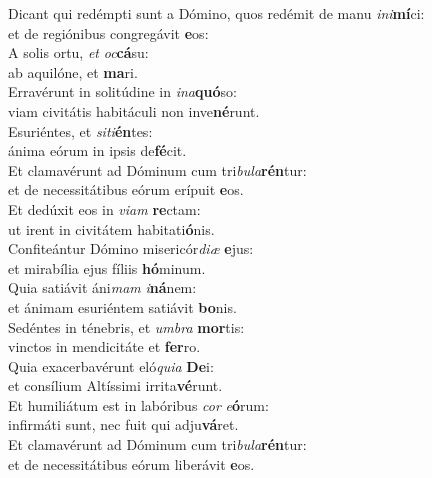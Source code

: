 \evenverse Dicant qui redémpti sunt a Dómino, quos redémit de manu \textit{i}\textit{ni}\textbf{mí}ci:~\*\\
\evenverse et de regiónibus congregávit \textbf{e}os:\\
\oddverse A solis ortu, \textit{et} \textit{oc}\textbf{cá}su:~\*\\
\oddverse ab aquilóne, et \textbf{ma}ri.\\
\evenverse Erravérunt in solitúdine in \textit{i}\textit{na}\textbf{quó}so:~\*\\
\evenverse viam civitátis habitáculi non inve\textbf{né}runt.\\
\oddverse Esuriéntes, et \textit{si}\textit{ti}\textbf{én}tes:~\*\\
\oddverse ánima eórum in ipsis de\textbf{fé}cit.\\
\evenverse Et clamavérunt ad Dóminum cum tri\textit{bu}\textit{la}\textbf{rén}tur:~\*\\
\evenverse et de necessitátibus eórum erípuit \textbf{e}os.\\
\oddverse Et dedúxit eos in \textit{vi}\textit{am} \textbf{re}ctam:~\*\\
\oddverse ut irent in civitátem habitati\textbf{ó}nis.\\
\evenverse Confiteántur Dómino misericór\textit{di}\textit{æ} \textbf{e}jus:~\*\\
\evenverse et mirabília ejus fíliis \textbf{hó}minum.\\
\oddverse Quia satiávit áni\textit{mam} \textit{i}\textbf{ná}nem:~\*\\
\oddverse et ánimam esuriéntem satiávit \textbf{bo}nis.\\
\evenverse Sedéntes in ténebris, et \textit{um}\textit{bra} \textbf{mor}tis:~\*\\
\evenverse vinctos in mendicitáte et \textbf{fer}ro.\\
\oddverse Quia exacerbavérunt eló\textit{qui}\textit{a} \textbf{De}i:~\*\\
\oddverse et consílium Altíssimi irrita\textbf{vé}runt.\\
\evenverse Et humiliátum est in labóribus \textit{cor} \textit{e}\textbf{ó}rum:~\*\\
\evenverse infirmáti sunt, nec fuit qui adju\textbf{vá}ret.\\
\oddverse Et clamavérunt ad Dóminum cum tri\textit{bu}\textit{la}\textbf{rén}tur:~\*\\
\oddverse et de necessitátibus eórum liberávit \textbf{e}os.\\
